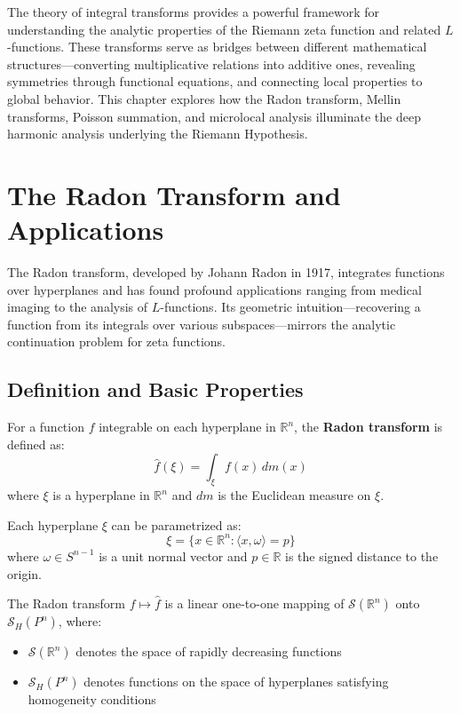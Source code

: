 \label{ch:integral-transforms}

The theory of integral transforms provides a powerful framework for understanding the analytic properties of the Riemann zeta function and related $L$-functions. These transforms serve as bridges between different mathematical structures—converting multiplicative relations into additive ones, revealing symmetries through functional equations, and connecting local properties to global behavior. This chapter explores how the Radon transform, Mellin transforms, Poisson summation, and microlocal analysis illuminate the deep harmonic analysis underlying the Riemann Hypothesis.

\section{The Radon Transform and Applications}
\label{sec:radon-transform}

The Radon transform, developed by Johann Radon in 1917, integrates functions over hyperplanes and has found profound applications ranging from medical imaging to the analysis of $L$-functions. Its geometric intuition—recovering a function from its integrals over various subspaces—mirrors the analytic continuation problem for zeta functions.

\subsection{Definition and Basic Properties}

\begin{definition}
For a function $f$ integrable on each hyperplane in $\mathbb{R}^n$, the \textbf{Radon transform} is defined as:
$$\hat{f}(\xi) = \int_{\xi} f(x) \, dm(x)$$
where $\xi$ is a hyperplane in $\mathbb{R}^n$ and $dm$ is the Euclidean measure on $\xi$.
\end{definition}

Each hyperplane $\xi$ can be parametrized as:
$$\xi = \{x \in \mathbb{R}^n : \langle x, \omega \rangle = p\}$$
where $\omega \in S^{n-1}$ is a unit normal vector and $p \in \mathbb{R}$ is the signed distance to the origin.

\begin{theorem}
The Radon transform $f \mapsto \hat{f}$ is a linear one-to-one mapping of $\mathcal{S}(\mathbb{R}^n)$ onto $\mathcal{S}_H(P^n)$, where:
\begin{itemize}
\item $\mathcal{S}(\mathbb{R}^n)$ denotes the space of rapidly decreasing functions
\item $\mathcal{S}_H(P^n)$ denotes functions on the space of hyperplanes satisfying homogeneity conditions
\end{itemize}
\end{theorem}

